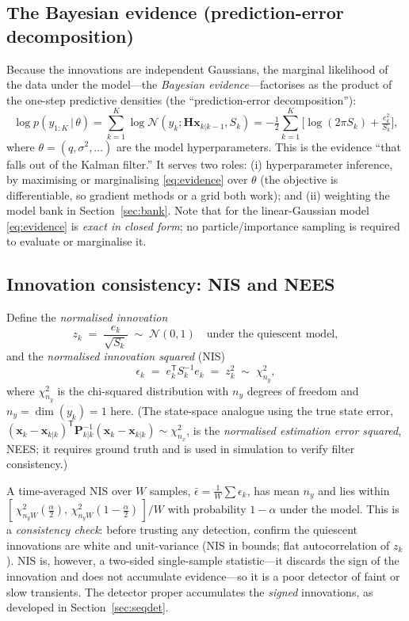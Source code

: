 \documentclass[11pt]{article}
\newcommand{\Norm}{\mathcal{N}}
\newcommand{\T}{^{\mathsf{T}}}
\newcommand{\given}{\,|\,}
\newcommand{\half}{\tfrac{1}{2}}
\begin{document}
\subsection{The Bayesian evidence (prediction-error decomposition)}
\label{sec:evidence}

Because the innovations are independent Gaussians, the marginal likelihood of the data
under the model---the \emph{Bayesian evidence}---factorises as the product of the
one-step predictive densities (the ``prediction-error decomposition''):
\begin{equation}
  \log p(y_{1:K}\given \theta)
  = \sum_{k=1}^{K}\log\Norm(y_k; \bm{H}\bm{x}_{k|k-1}, S_k)
  = -\half\sum_{k=1}^{K}\Big[\log(2\pi S_k) + \tfrac{e_k^2}{S_k}\Big],
  \label{eq:evidence}
\end{equation}
where $\theta=(q,\sigma^2,\dots)$ are the model hyperparameters. This is the evidence
``that falls out of the Kalman filter.'' It serves two roles: (i) hyperparameter
inference, by maximising or marginalising \eqref{eq:evidence} over $\theta$ (the
objective is differentiable, so gradient methods or a grid both work); and (ii)
weighting the model bank in Section~\ref{sec:bank}. Note that for the linear-Gaussian
model \eqref{eq:evidence} is \emph{exact in closed form}; no particle/importance
sampling is required to evaluate or marginalise it.

\subsection{Innovation consistency: NIS and NEES}
\label{sec:nis}

Define the \emph{normalised innovation}
\begin{equation}
  z_k \;=\; \frac{e_k}{\sqrt{S_k}} \;\sim\; \Norm(0,1)\quad\text{under the quiescent model},
\end{equation}
and the \emph{normalised innovation squared} (NIS)
\begin{equation}
  \epsilon_k \;=\; e_k\T S_k^{-1} e_k \;=\; z_k^2 \;\sim\; \chi^2_{n_y},
\end{equation}
where $\chi^2_{n_y}$ is the chi-squared distribution with $n_y$ degrees of freedom and
$n_y=\dim(y_k)=1$ here. (The state-space analogue using the true state error,
$(\bm{x}_k-\bm{x}_{k|k})\T\bm{P}_{k|k}^{-1}(\bm{x}_k-\bm{x}_{k|k})\sim\chi^2_{n_x}$, is
the \emph{normalised estimation error squared}, NEES; it requires ground truth and is
used in simulation to verify filter consistency.)

A time-averaged NIS over $W$ samples, $\bar\epsilon=\tfrac1W\sum\epsilon_k$, has mean
$n_y$ and lies within $[\,\chi^2_{n_y W}(\tfrac\alpha2),\,\chi^2_{n_y W}(1-\tfrac\alpha2)\,]/W$
with probability $1-\alpha$ under the model. This is a \emph{consistency check}:
before trusting any detection, confirm the quiescent innovations are white and
unit-variance (NIS in bounds; flat autocorrelation of $z_k$). NIS is, however, a
two-sided single-sample statistic---it discards the sign of the innovation and does
not accumulate evidence---so it is a poor detector of faint or slow transients. The
detector proper accumulates the \emph{signed} innovations, as developed in Section~\ref{sec:seqdet}.
\end{document}
